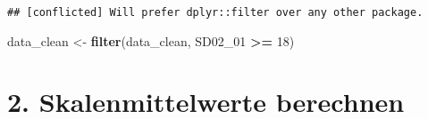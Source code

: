 \documentclass[
]{article}
\newenvironment{Shaded}{\begin{snugshade}}{\end{snugshade}}
\newcommand{\DecValTok}[1]{\textcolor[rgb]{0.00,0.00,0.81}{#1}}
\newcommand{\FunctionTok}[1]{\textcolor[rgb]{0.13,0.29,0.53}{\textbf{#1}}}
\newcommand{\NormalTok}[1]{#1}
\newcommand{\OtherTok}[1]{\textcolor[rgb]{0.56,0.35,0.01}{#1}}
\newcommand{\SpecialCharTok}[1]{\textcolor[rgb]{0.81,0.36,0.00}{\textbf{#1}}}
\begin{document}
\begin{verbatim}
## [conflicted] Will prefer dplyr::filter over any other package.
\end{verbatim}

\begin{Shaded}
\begin{Highlighting}[]
\NormalTok{data\_clean }\OtherTok{\textless{}{-}} \FunctionTok{filter}\NormalTok{(data\_clean, SD02\_01 }\SpecialCharTok{\textgreater{}=} \DecValTok{18}\NormalTok{)}
\end{Highlighting}
\end{Shaded}

\section{2. Skalenmittelwerte
berechnen}\label{skalenmittelwerte-berechnen}
\end{document}
